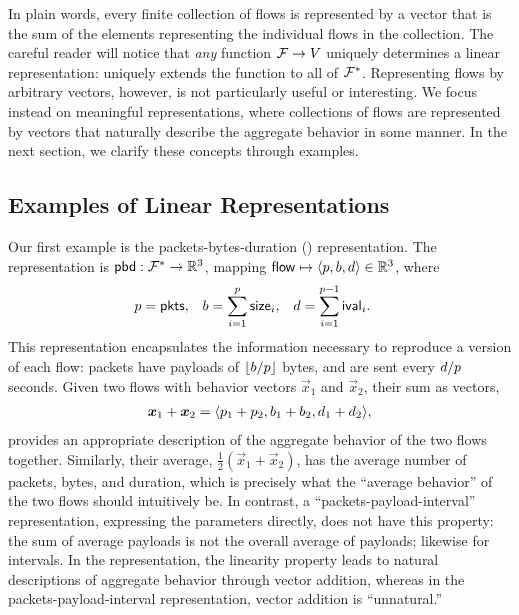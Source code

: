 \documentclass[twocolumn,final]{svjour3}
\begin{document}
\noindent
In plain words, every finite collection of flows is represented by a vector that is the sum of the elements representing the individual flows in the collection.
The careful reader will notice that \emph{any} function $\mathcal{F} \to V$ uniquely determines a linear representation:
 uniquely extends the function to all of $\mathcal{F}^*$.
Representing flows by arbitrary vectors, however, is not particularly useful or interesting.
We focus instead on meaningful representations, where collections of flows are represented by vectors that naturally describe the aggregate behavior in some manner.
In the next section, we clarify these concepts through examples.

\subsection{Examples of Linear Representations}


Our first example is the packets-bytes-duration () representation.
The representation is $\text{\textsf{pbd}}: \mathcal{F}^* \to \mathbb{R}^3$, mapping
$\text{\textsf{flow}} \mapsto {\left<p,b,d\right>} \in \mathbb{R}^3$, where
\begin{align}
p &= \pkts, &
b &= \sum_{i=1}^{\mathclap{p}}{\size_i}, &
d &= \sum_{i=1}^{\mathclap{p-1}}{\ival_i}.
\end{align}
This representation encapsulates the information necessary to reproduce a  version of each flow:
packets have payloads of ${\left\lfloor{b/p}\right\rfloor}$ bytes, and are sent every ${d/p}$ seconds.\pbdnote
Given two flows with behavior vectors $\vec{x}_1$ and $\vec{x}_2$, their sum as vectors, 
\begin{align}
\vec{x}_1+\vec{x}_2=\tuple{p_1+p_2,b_1+b_2,d_1+d_2},
\end{align}
provides an appropriate description of the aggregate behavior of the two flows together.
Similarly, their average,  $\frac{1}{2}(\vec{x}_1+\vec{x}_2)$, has the average number of packets, bytes, and duration, which is precisely what the ``average behavior'' of the two flows should intuitively be.
In contrast, a ``packets-payload-interval'' representation, expressing the  parameters directly, does not have this property:
the sum of average payloads is not the overall average of payloads;
likewise for intervals.
In the  representation, the linearity property leads to natural descriptions of aggregate behavior through vector addition, whereas in the packets-payload-interval representation, vector addition is ``unnatural.''
\end{document}
